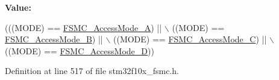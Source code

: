 {\bfseries Value\+:}
\begin{DoxyCode}
(((MODE) == \hyperlink{group___f_s_m_c___access___mode_gae0f299b51c12257311694c4a8f5c00c3}{FSMC\_AccessMode\_A}) || \(\backslash\)
                                   ((MODE) == \hyperlink{group___f_s_m_c___access___mode_ga2d6ce7481eb5e0e86fda727c646e4109}{FSMC\_AccessMode\_B}) || \(\backslash\)
                                   ((MODE) == \hyperlink{group___f_s_m_c___access___mode_ga83ffa035cf2e95c957b67a2e8b879e86}{FSMC\_AccessMode\_C}) || \(\backslash\)
                                   ((MODE) == \hyperlink{group___f_s_m_c___access___mode_ga7c632e7ebeb0c0ab4919bb60b8714c7b}{FSMC\_AccessMode\_D}))
\end{DoxyCode}


Definition at line 517 of file stm32f10x\+\_\+fsmc.\+h.

